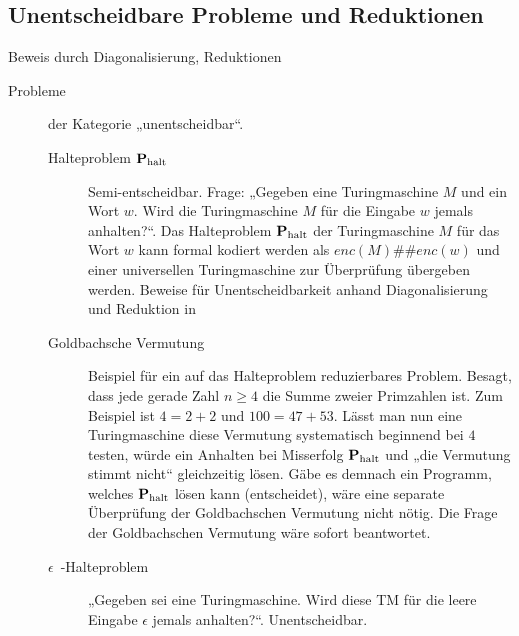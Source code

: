 \subsection{Unentscheidbare Probleme und Reduktionen}
    Beweis durch Diagonalisierung, Reduktionen 
    \begin{description}
        \item[Probleme] der Kategorie „unentscheidbar“.
        \begin{description}
            \item[Halteproblem $\textbf{P}_{\text{halt}}$] Semi-entscheidbar. Frage: „Gegeben eine Turingmaschine $M$ und ein Wort $w$. Wird die Turingmaschine $M$ für die Eingabe $w$ jemals anhalten?“. Das Halteproblem $\textbf{P}_{\text{halt}}$ der Turingmaschine $M$ für das Wort $w$ kann formal kodiert werden als $enc(M)\#\#enc(w)$ und einer universellen Turingmaschine zur Überprüfung übergeben werden. Beweise für Unentscheidbarkeit anhand Diagonalisierung und Reduktion in 

            \item[Goldbachsche Vermutung] Beispiel für ein auf das Halteproblem reduzierbares Problem. Besagt, dass jede gerade Zahl $n \ge 4$ die Summe zweier Primzahlen ist. Zum Beispiel ist $4 = 2 + 2$ und $100 = 47 + 53$. Lässt man nun eine Turingmaschine diese Vermutung systematisch beginnend bei $4$ testen, würde ein Anhalten bei Misserfolg $\textbf{P}_{\text{halt}}$ und „die Vermutung stimmt nicht“ gleichzeitig lösen. Gäbe es demnach ein Programm, welches $\textbf{P}_{\text{halt}}$ lösen kann (entscheidet), wäre eine separate Überprüfung der Goldbachschen Vermutung nicht nötig. Die Frage der Goldbachschen Vermutung wäre sofort beantwortet.

            \item[$\epsilon$~-Halteproblem] „Gegeben sei eine Turingmaschine. Wird diese TM für die leere Eingabe $\epsilon$ jemals anhalten?“. Unentscheidbar.
        \end{description}


\end{description}
